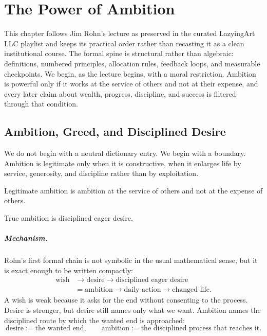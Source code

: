 \chapter{The Power of Ambition}

This chapter follows Jim Rohn's lecture as preserved in the curated LazyingArt LLC playlist and keeps its practical order rather than recasting it as a clean institutional course. The formal spine is structural rather than algebraic: definitions, numbered principles, allocation rules, feedback loops, and measurable checkpoints. We begin, as the lecture begins, with a moral restriction. Ambition is powerful only if it works at the service of others and not at their expense, and every later claim about wealth, progress, discipline, and success is filtered through that condition.

\section{Ambition, Greed, and Disciplined Desire}

We do not begin with a neutral dictionary entry. We begin with a boundary. Ambition is legitimate only when it is constructive, when it enlarges life by service, generosity, and discipline rather than by exploitation.

\begin{definition}
Legitimate ambition is ambition at the service of others and not at the expense of others.
\end{definition}

\begin{definition}
True ambition is disciplined eager desire.
\end{definition}

\paragraph{Mechanism.}
Rohn's first formal chain is not symbolic in the usual mathematical sense, but it is exact enough to be written compactly:
\begin{align}
\text{wish} &\longrightarrow \text{desire} \longrightarrow \text{disciplined eager desire} \\
&= \text{ambition} \longrightarrow \text{daily action} \longrightarrow \text{changed life}.
\end{align}
A wish is weak because it asks for the end without consenting to the process. Desire is stronger, but desire still names only what we want. Ambition names the disciplined route by which the wanted end is approached:
\begin{equation}
\text{desire} := \text{the wanted end}, \qquad
\text{ambition} := \text{the disciplined process that reaches it}.
\end{equation}

